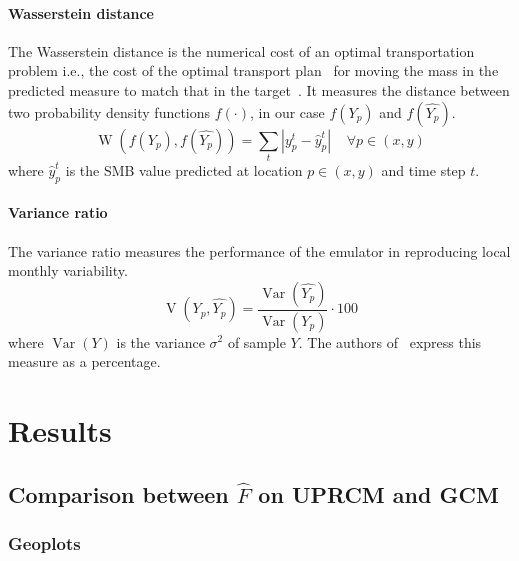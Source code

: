 \documentclass[a4paper,11pt,oneside]{report}
\begin{document}
\subsubsection{Wasserstein distance}\label{subsubsec:wasserstein}
The Wasserstein distance is the numerical cost of an optimal transportation problem i.e., the cost of
the optimal transport plan~\cite{villani} for moving the mass in the predicted
measure to match that in the target~\cite{wasserstein1}. It measures the distance between two probability density functions $f(\cdotp)$, in our case $f(Y_p)$ and $f(\widehat{Y_p})$.
\begin{equation}
    \operatorname{W}\left(f(Y_p),f(\widehat{Y_p})\right) = \sum_{t}|y^{t}_{p}-\hat{y}_{p}^{t}| \;\;\;\; \forall p \in (x,y)
\end{equation}
 where $\hat{y}_{p}^{t}$ is the SMB value predicted at location $p\in (x,y)$ and time step $t$.

\subsubsection{Variance ratio}\label{subsubsec:variance-ratio}
 The variance ratio measures the performance of the emulator in reproducing local monthly variability. 
 \begin{equation}
     \operatorname{V}(Y_{p},\widehat{Y_{p}}) = \frac{\operatorname{Var}(\widehat{Y_{p}})}{\operatorname{Var}(Y_{p})}\cdot100
 \end{equation}
 where $\operatorname{Var}(Y)$ is the variance $\sigma^2$ of sample $Y$. The authors of~\cite{Doury} express this measure as a percentage. 



\chapter{Results}

\section{Comparison between $\hat{F}$ on UPRCM and GCM}
\subsection{Geoplots}
\end{document}
